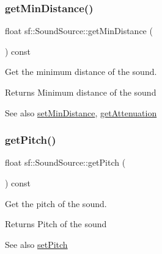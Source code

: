 \subsubsection{\texorpdfstring{get\+Min\+Distance()}{getMinDistance()}}
{\footnotesize\ttfamily float sf\+::\+Sound\+Source\+::get\+Min\+Distance (\begin{DoxyParamCaption}{ }\end{DoxyParamCaption}) const}



Get the minimum distance of the sound. 

\begin{DoxyReturn}{Returns}
Minimum distance of the sound
\end{DoxyReturn}
\begin{DoxySeeAlso}{See also}
\hyperlink{classsf_1_1_sound_source_a75bbc2c34addc8b25a14edb908508afe}{set\+Min\+Distance}, \hyperlink{classsf_1_1_sound_source_a8ad7dafb4f1b4afbc638cebe24f48cc9}{get\+Attenuation} 
\end{DoxySeeAlso}
\mbox{\label{classsf_1_1_sound_source_a4736acc2c802f927544c9ce52a44a9e4}} 
\subsubsection{\texorpdfstring{get\+Pitch()}{getPitch()}}
{\footnotesize\ttfamily float sf\+::\+Sound\+Source\+::get\+Pitch (\begin{DoxyParamCaption}{ }\end{DoxyParamCaption}) const}



Get the pitch of the sound. 

\begin{DoxyReturn}{Returns}
Pitch of the sound
\end{DoxyReturn}
\begin{DoxySeeAlso}{See also}
\hyperlink{classsf_1_1_sound_source_a72a13695ed48b7f7b55e7cd4431f4bb6}{set\+Pitch} 
\end{DoxySeeAlso}
\mbox{\label{classsf_1_1_sound_source_a8d199521f55550c7a3b2b0f6950dffa1}} 
